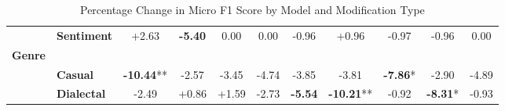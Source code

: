 \begin{table}[h]
\begin{adjustbox}{max width=\linewidth}
\begin{tabular}{llccccccccc}
& \textbf{Sentiment} & \cellcolor{green!7} +2.63 & \cellcolor{red!16} \textbf{-5.40} & \cellcolor{red!0} 0.00 & \cellcolor{red!0} 0.00 & \cellcolor{red!2} -0.96 & \cellcolor{green!2} +0.96 & \cellcolor{red!2} -0.97 & \cellcolor{red!2} -0.96 & \cellcolor{red!0} 0.00 \\
\textbf{Genre} & & & & & & & \\
& \textbf{Casual} & \cellcolor{red!30} \textbf{-10.44}** & \cellcolor{red!7} -2.57 & \cellcolor{red!10} -3.45 & \cellcolor{red!14} -4.74 & \cellcolor{red!11} -3.85 & \cellcolor{red!11} -3.81 & \cellcolor{red!23} \textbf{-7.86}* & \cellcolor{red!8} -2.90 & \cellcolor{red!14} -4.89 \\
& \textbf{Dialectal} & \cellcolor{red!7} -2.49 & \cellcolor{green!2} +0.86 & \cellcolor{green!4} +1.59 & \cellcolor{red!8} -2.73 & \cellcolor{red!16} \textbf{-5.54} & \cellcolor{red!30} \textbf{-10.21}** & \cellcolor{red!2} -0.92 & \cellcolor{red!24} \textbf{-8.31}* & \cellcolor{red!2} -0.93 \\
\end{tabular}
\end{adjustbox}
\caption{Percentage Change in Micro F1 Score by Model and Modification Type}
\label{tab:dialogue_results_table}
\end{table}